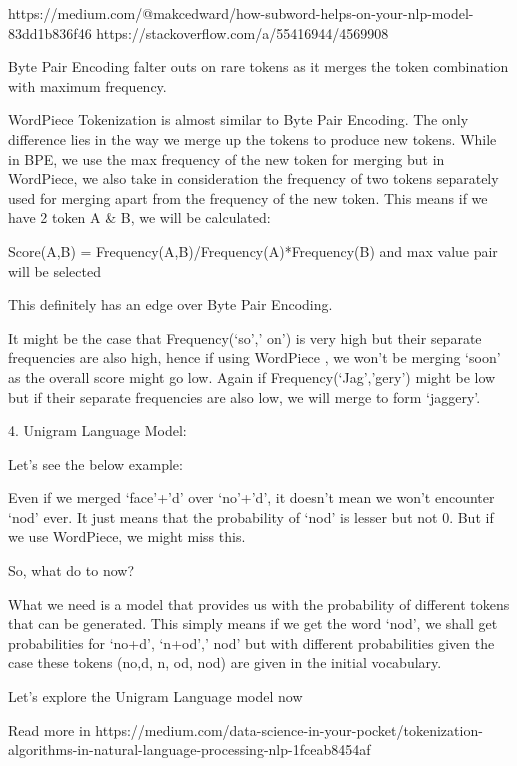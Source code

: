 https://medium.com/@makcedward/how-subword-helps-on-your-nlp-model-83dd1b836f46
https://stackoverflow.com/a/55416944/4569908


Byte Pair Encoding falter outs on rare tokens as it merges the token combination with maximum frequency.

WordPiece Tokenization is almost similar to Byte Pair Encoding. The only difference lies in the way we merge up the tokens to produce new tokens. While in BPE, we use the max frequency of the new token for merging but in WordPiece, we also take in consideration the frequency of two tokens separately used for merging apart from the frequency of the new token. This means if we have 2 token A \& B, we will be calculated:

Score(A,B) = Frequency(A,B)/Frequency(A)*Frequency(B) and max value pair will be selected

This definitely has an edge over Byte Pair Encoding.

It might be the case that Frequency(‘so’,’ on’) is very high but their separate frequencies are also high, hence if using WordPiece , we won’t be merging ‘soon’ as the overall score might go low. Again if Frequency(‘Jag’,’gery’) might be low but if their separate frequencies are also low, we will merge to form ‘jaggery’.

4. Unigram Language Model:

Let’s see the below example:

Even if we merged ‘face’+’d’ over ‘no’+’d’, it doesn’t mean we won’t encounter ‘nod’ ever. It just means that the probability of ‘nod’ is lesser but not 0. But if we use WordPiece, we might miss this.

So, what do to now?

What we need is a model that provides us with the probability of different tokens that can be generated. This simply means if we get the word ‘nod’, we shall get probabilities for ‘no+d’, ‘n+od’,’ nod’ but with different probabilities given the case these tokens (no,d, n, od, nod) are given in the initial vocabulary.

Let’s explore the Unigram Language model now

Read more in https://medium.com/data-science-in-your-pocket/tokenization-algorithms-in-natural-language-processing-nlp-1fceab8454af


